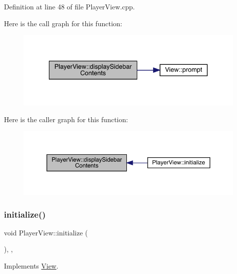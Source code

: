 Definition at line 48 of file Player\+View.\+cpp.

Here is the call graph for this function\+:
\nopagebreak
\begin{figure}[H]
\begin{center}
\leavevmode
\includegraphics[width=327pt]{class_player_view_ab0056b8fbbab777cc0559425496f89c9_cgraph}
\end{center}
\end{figure}
Here is the caller graph for this function\+:
\nopagebreak
\begin{figure}[H]
\begin{center}
\leavevmode
\includegraphics[width=350pt]{class_player_view_ab0056b8fbbab777cc0559425496f89c9_icgraph}
\end{center}
\end{figure}
\mbox{\label{class_player_view_a8f41109707205d01009aab96f72d338f}} 
\subsubsection{\texorpdfstring{initialize()}{initialize()}}
{\footnotesize\ttfamily void Player\+View\+::initialize (\begin{DoxyParamCaption}{ }\end{DoxyParamCaption})\hspace{0.3cm}{\ttfamily [inline]}, {\ttfamily [override]}, {\ttfamily [virtual]}}



Implements \mbox{\hyperlink{class_view_a267f7ca5c1e77fcbc28fd57c90628b7d}{View}}.



